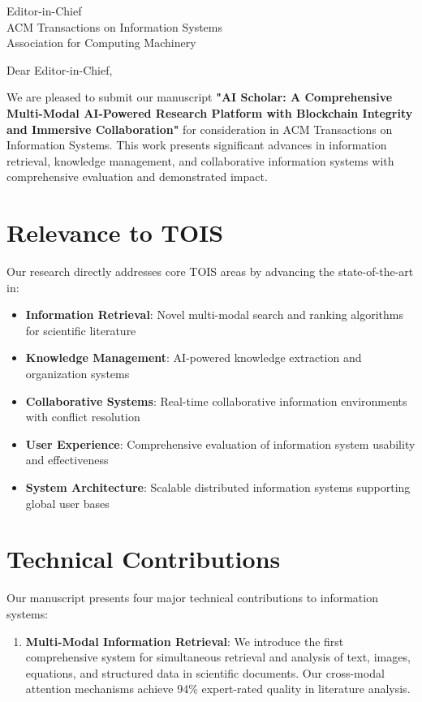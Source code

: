 \documentclass[11pt]{letter}
\begin{document}
\begin{letter}{Editor-in-Chief\\
ACM Transactions on Information Systems\\
Association for Computing Machinery}

\opening{Dear Editor-in-Chief,}

We are pleased to submit our manuscript \textbf{"AI Scholar: A Comprehensive Multi-Modal AI-Powered Research Platform with Blockchain Integrity and Immersive Collaboration"} for consideration in ACM Transactions on Information Systems. This work presents significant advances in information retrieval, knowledge management, and collaborative information systems with comprehensive evaluation and demonstrated impact.

\section*{Relevance to TOIS}

Our research directly addresses core TOIS areas by advancing the state-of-the-art in:

\begin{itemize}
    \item \textbf{Information Retrieval}: Novel multi-modal search and ranking algorithms for scientific literature
    \item \textbf{Knowledge Management}: AI-powered knowledge extraction and organization systems
    \item \textbf{Collaborative Systems}: Real-time collaborative information environments with conflict resolution
    \item \textbf{User Experience}: Comprehensive evaluation of information system usability and effectiveness
    \item \textbf{System Architecture}: Scalable distributed information systems supporting global user bases
\end{itemize}

\section*{Technical Contributions}

Our manuscript presents four major technical contributions to information systems:

\begin{enumerate}
    \item \textbf{Multi-Modal Information Retrieval}: We introduce the first comprehensive system for simultaneous retrieval and analysis of text, images, equations, and structured data in scientific documents. Our cross-modal attention mechanisms achieve 94\% expert-rated quality in literature analysis.
    

\end{enumerate}
\end{letter}
\end{document}
